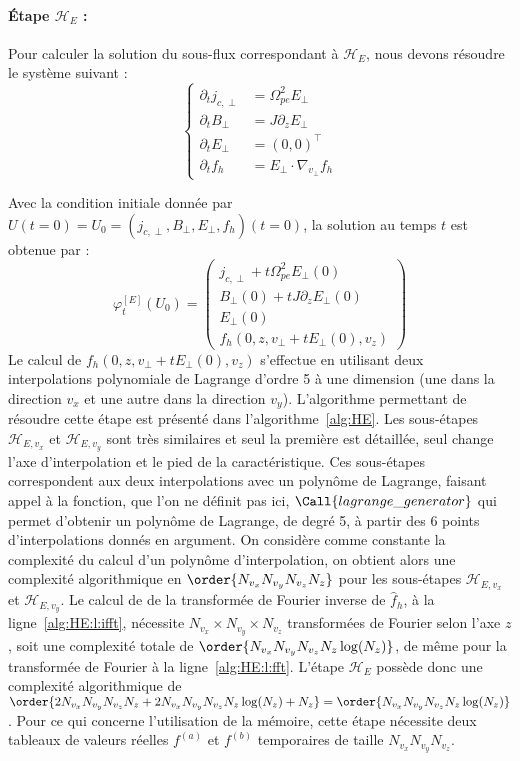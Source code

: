 \paragraph{Étape $\mathcal{H}_E$ :}
Pour calculer la solution du sous-flux correspondant à $\mathcal{H}_E$, nous devons résoudre le système suivant :
$$
  \begin{cases}
    \partial_t j_{c,\perp} &= \Omega_{pe}^2E_{\perp} \\
    \partial_t B_\perp     &= J\partial_zE_\perp \\
    \partial_t E_\perp     &= (0,0)^\top \\
    \partial_t f_h         &= E_\perp\cdot\nabla_{v_\perp}f_h
  \end{cases}
$$

Avec la condition initiale donnée par $U(t=0)=U_0=(j_{c,\perp},B_\perp,E_\perp,f_h)(t=0)$, la solution au temps $t$ est obtenue par :
$$
  \varphi_t^{[E]}(U_0) = \begin{pmatrix}
    j_{c,\perp} + t\Omega_{pe}^2E_{\perp}(0)\\
    B_\perp(0)+tJ\partial_zE_\perp(0) \\
    E_\perp(0) \\
    f_h(0,z,v_\perp+tE_\perp(0),v_z)
  \end{pmatrix}
$$
Le calcul de $f_h(0,z,v_\perp+tE_\perp(0),v_z)$ s'effectue en utilisant deux interpolations polynomiale de Lagrange d'ordre 5 à une dimension (une dans la direction $v_x$ et une autre dans la direction $v_y$). L'algorithme permettant de résoudre cette étape est présenté dans l'algorithme~\ref{alg:HE}. Les sous-étapes $\mathcal{H}_{E,v_x}$ et $\mathcal{H}_{E,v_y}$ sont très similaires et seul la première est détaillée, seul change l'axe d'interpolation et le pied de la caractéristique. Ces sous-étapes correspondent aux deux interpolations avec un polynôme de Lagrange, faisant appel à la fonction, que l'on ne définit pas ici, $\Call{lagrange\_generator}$ qui permet d'obtenir un polynôme de Lagrange, de degré 5, à partir des 6 points d'interpolations donnés en argument. On considère comme constante la complexité du calcul d'un polynôme d'interpolation, on obtient alors une complexité algorithmique en $\order{N_{v_x}N_{v_y}N_{v_z}N_z}$ pour les sous-étapes $\mathcal{H}_{E,{v_x}}$ et $\mathcal{H}_{E,{v_y}}$. Le calcul de de la transformée de Fourier inverse de $\hat{f}_h$, à la ligne~\ref{alg:HE:l:ifft}, nécessite $N_{v_x}\times N_{v_y}\times N_{v_z}$ transformées de Fourier selon l'axe $z$, soit une complexité totale de $\order{N_{v_x}N_{v_y}N_{v_z}N_z\log(N_z)}$, de même pour la transformée de Fourier à la ligne~\ref{alg:HE:l:fft}. L'étape $\mathcal{H}_{E}$ possède donc une complexité algorithmique de $\order{2N_{v_x}N_{v_y}N_{v_z}N_z + 2N_{v_x}N_{v_y}N_{v_z}N_z\log(N_z) + N_z} = \order{N_{v_x}N_{v_y}N_{v_z}N_z\log(N_z)}$. Pour ce qui concerne l'utilisation de la mémoire, cette étape nécessite deux tableaux de valeurs réelles $f^{(a)}$ et $f^{(b)}$ temporaires de taille $N_{v_x}N_{v_y}N_{v_z}$.
